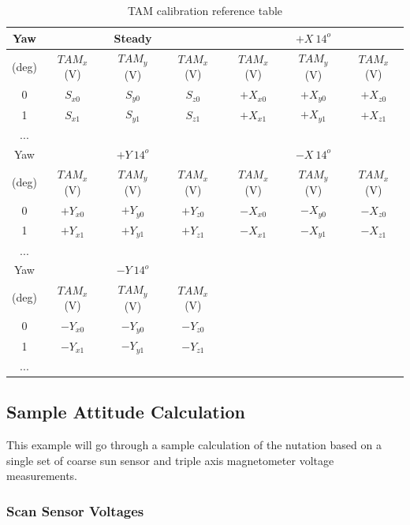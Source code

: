 \begin{table}[H]
  \centering
  \begin{tabular}{c|ccc|ccc}
    \hline
    Yaw   & & Steady & & & $+X \ 14^o$ & \\ \hline
    (deg) & $TAM_x$ (V) & $TAM_y$ (V) & $TAM_x$ (V) & $TAM_x$ (V) & $TAM_y$ (V) & $TAM_x$ (V)  \\ \hline
    0 & $S_{x0}$ & $S_{y0}$ & $S_{z0}$ & $+X_{x0}$ & $+X_{y0}$ & $+X_{z0}$ \\ \hline
    1 & $S_{x1}$ & $S_{y1}$ & $S_{z1}$ & $+X_{x1}$ & $+X_{y1}$ & $+X_{z1}$ \\ \hline
    ... & & & & & &  \\ \hline
    Yaw   & & $+Y \ 14^o$ & & & $-X \ 14^o$ & \\ \hline
    (deg) & $TAM_x$ (V) & $TAM_y$ (V) & $TAM_x$ (V) & $TAM_x$ (V) & $TAM_y$ (V) & $TAM_x$ (V)  \\ \hline
    0 & $+Y_{x0}$ & $+Y_{y0}$ & $+Y_{z0}$ & $-X_{x0}$ & $-X_{y0}$ & $-X_{z0}$ \\ \hline
    1 & $+Y_{x1}$ & $+Y_{y1}$ & $+Y_{z1}$ & $-X_{x1}$ & $-X_{y1}$ & $-X_{z1}$ \\ \hline
    ... & & & & & &  \\ \hline
    Yaw   & & $-Y \ 14^o$ & &  \\ \hline
    (deg) & $TAM_x$ (V) & $TAM_y$ (V) & $TAM_x$ (V)  \\ \hline
    0 & $-Y_{x0}$ & $-Y_{y0}$ & $-Y_{z0}$  \\ \hline
    1 & $-Y_{x1}$ & $-Y_{y1}$ & $-Y_{z1}$  \\ \hline
    ... & & & & & &  \\ \hline
  \end{tabular}
  \caption{TAM calibration reference table}
  \label{tbl:TAMCalibration}
\end{table}

\subsection{Sample Attitude Calculation}
\label{subsec:SampleAttitudeCalculation}

This example will go through a sample calculation of the nutation based on a single set of coarse sun sensor and triple axis magnetometer voltage measurements.

\subsubsection{Scan Sensor Voltages}

